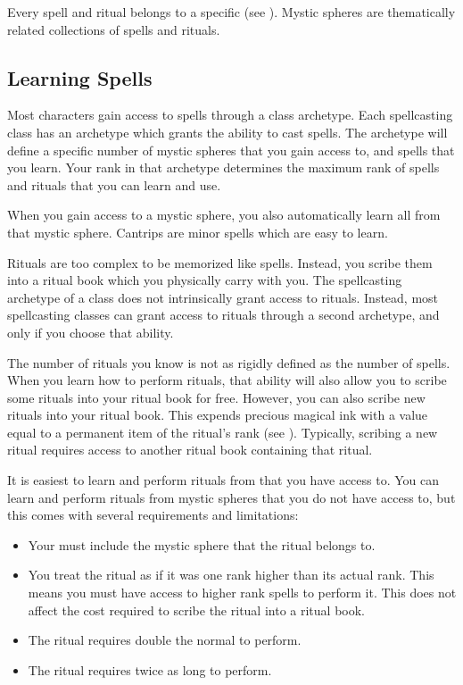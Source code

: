   Every spell and ritual belongs to a specific  (see ).
  Mystic spheres are thematically related collections of spells and rituals.

  \subsection{Learning Spells}\label{Learning Spells}
    Most characters gain access to spells through a class archetype.
    Each spellcasting class has an archetype which grants the ability to cast spells.
    The archetype will define a specific number of mystic spheres that you gain access to, and spells that you learn.
    Your rank in that archetype determines the maximum rank of spells and rituals that you can learn and use.

    When you gain access to a mystic sphere, you also automatically learn all  from that mystic sphere.
    Cantrips are minor spells which are easy to learn.


    Rituals are too complex to be memorized like spells.
    Instead, you scribe them into a ritual book which you physically carry with you.
    The spellcasting archetype of a class does not intrinsically grant access to rituals.
    Instead, most spellcasting classes can grant access to rituals through a second archetype, and only if you choose that ability.

    The number of rituals you know is not as rigidly defined as the number of spells.
    When you learn how to perform rituals, that ability will also allow you to scribe some rituals into your ritual book for free.
    However, you can also scribe new rituals into your ritual book.
    This expends precious magical ink with a value equal to a permanent item of the ritual's rank (see ).
    Typically, scribing a new ritual requires access to another ritual book containing that ritual.

    It is easiest to learn and perform rituals from  that you have access to.
    You can learn and perform rituals from mystic spheres that you do not have access to, but this comes with several requirements and limitations:
    \begin{itemize}
      \item Your  must include the mystic sphere that the ritual belongs to.
      \item You treat the ritual as if it was one rank higher than its actual rank.
        This means you must have access to higher rank spells to perform it.
        This does not affect the cost required to scribe the ritual into a ritual book.
      \item The ritual requires double the normal  to perform.
      \item The ritual requires twice as long to perform.
    \end{itemize}

